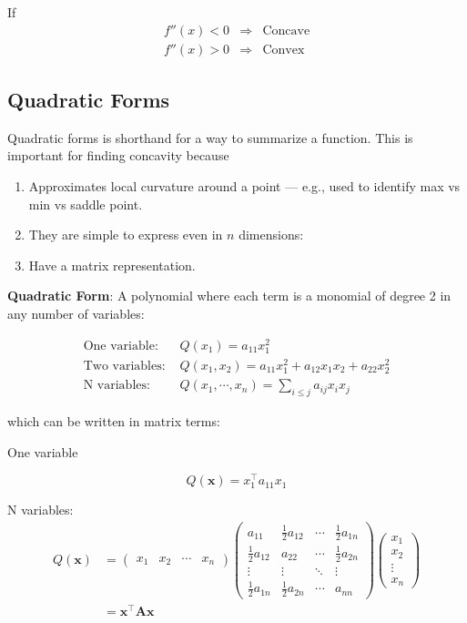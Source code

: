 \documentclass[
]{book}
\providecommand{\tightlist}{%
  \setlength{\itemsep}{0pt}\setlength{\parskip}{0pt}}
\theoremstyle{definition}
\theoremstyle{definition}
\theoremstyle{definition}
\theoremstyle{remark}
\begin{document}
If
\[\begin{array}{lll}
f''(x) < 0 & \Rightarrow & \text{Concave}\\
f''(x) > 0 & \Rightarrow & \text{Convex}
\end{array}\]

\hypertarget{quadratic-forms}{%
\subsection*{Quadratic Forms}\label{quadratic-forms}}

Quadratic forms is shorthand for a way to summarize a function. This is important for finding concavity because

\begin{enumerate}
\def\labelenumi{\arabic{enumi}.}
\tightlist
\item
  Approximates local curvature around a point --- e.g., used to
  identify max vs min vs saddle point.
\item
  They are simple to express even in \(n\) dimensions:
\item
  Have a matrix representation.
\end{enumerate}

\textbf{Quadratic Form}: A polynomial where each term is a monomial
of degree 2 in any number of variables:

\begin{align*}
\text{One variable: }& Q(x_1) = a_{11}x_1^2\\
\text{Two variables: }& Q(x_1,x_2) = a_{11}x_1^2 + a_{12}x_1x_2 + a_{22}x_2^2\\
\text{N variables: }& Q(x_1,\cdots,x_n)=\sum\limits_{i\le j} a_{ij}x_i x_j
\end{align*}

which can be written in matrix terms:

One variable

\[Q(\mathbf{x}) = x_1^\top a_{11} x_1\]

N variables:
\begin{align*}
Q(\mathbf{x}) &=\begin{pmatrix} x_1 & x_2 & \cdots & x_n \end{pmatrix}\begin{pmatrix}
a_{11}&\frac{1}{2}a_{12}&\cdots&\frac{1}{2}a_{1n}\\
\frac{1}{2}a_{12}&a_{22}&\cdots&\frac{1}{2}a_{2n}\\
\vdots&\vdots&\ddots&\vdots\\
\frac{1}{2}a_{1n}&\frac{1}{2}a_{2n}&\cdots&a_{nn}
\end{pmatrix}
\begin{pmatrix} x_1\\x_2\\\vdots\\x_n\end{pmatrix}\\
&= \mathbf{x}^\top\mathbf{Ax}
\end{align*}
\end{document}
